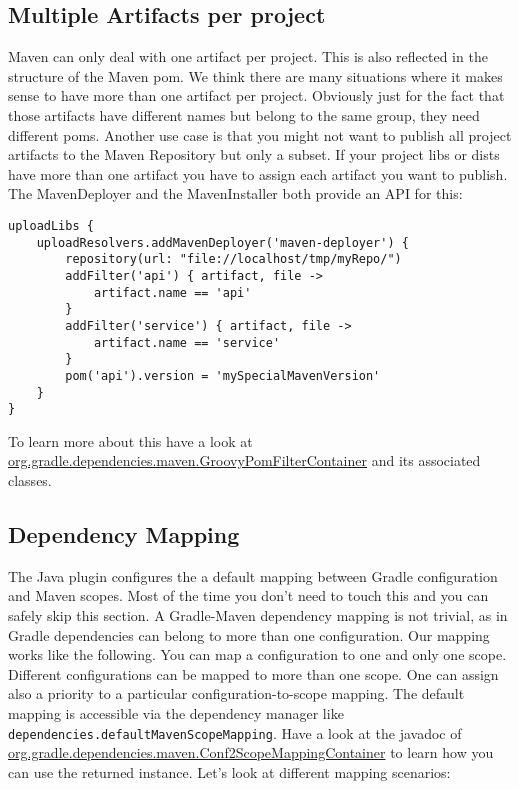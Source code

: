 \subsection{Multiple Artifacts per project} %
\label{sub:multiple_artifacts_per_project}
Maven can only deal with one artifact per project. This is also reflected in the structure of the Maven pom. We think there are many situations where it makes sense to have more than one artifact per project. Obviously just for the fact that those artifacts have different names but belong to the same group, they need different poms. Another use case is that you might not want to publish all project artifacts to the Maven Repository but only a subset. If your project libs or dists have more than one artifact you have to assign each artifact you want to publish. The MavenDeployer and the MavenInstaller both provide an API for this:
\begin{Verbatim}
uploadLibs {
    uploadResolvers.addMavenDeployer('maven-deployer') {
        repository(url: "file://localhost/tmp/myRepo/")
        addFilter('api') { artifact, file ->
			artifact.name == 'api'
		}
		addFilter('service') { artifact, file ->
			artifact.name == 'service'
		}
		pom('api').version = 'mySpecialMavenVersion'
    }
}
\end{Verbatim}
To learn more about this have a look at \href{\API dependencies/maven/GroovyPomFilterContainer.html}{org.gradle.dependencies.maven.GroovyPomFilterContainer} and its associated classes.
\subsection{Dependency Mapping} %
\label{sub:dependency_mapping}
The Java plugin configures the a default mapping between Gradle configuration and Maven scopes. Most of the time you don't need to touch this and you can safely skip this section. A Gradle-Maven dependency mapping is not trivial, as in Gradle dependencies can belong to more than one configuration. Our mapping works like the following. You can map a configuration to one and only one scope. Different configurations can be mapped to more than one scope. One can assign also a priority to a particular configuration-to-scope mapping. The default mapping is accessible via the dependency manager like \texttt{dependencies.defaultMavenScopeMapping}. Have a look at the javadoc of \href{\API dependencies/maven/Conf2ScopeMappingContainer.html}{org.gradle.dependencies.maven.Conf2ScopeMappingContainer} to learn how you can use the returned instance. Let's look at different mapping scenarios:


